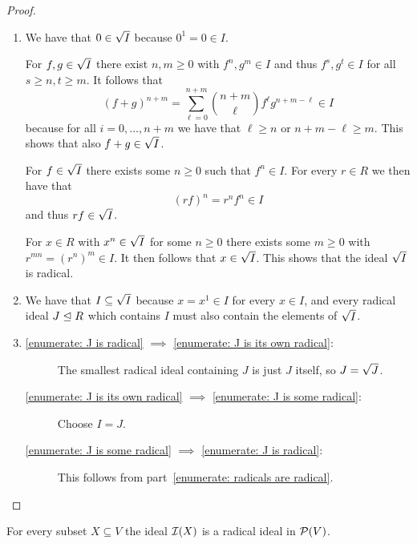 \begin{proof}
    \leavevmode
  \begin{enumerate}
    \item
      We have that $0 \in \sqrt{I}$ because $0^1 = 0 \in I$.
      
      For $f, g \in \sqrt{I}$ there exist $n, m \geq 0$ with $f^n, g^m \in I$ and thus $f^s, g^t \in I$ for all $s \geq n, t \geq m$.
      It follows that
      \[
            (f + g)^{n+m}
        =   \sum_{\ell=0}^{n+m} \binom{n+m}{\ell} f^\ell g^{n+m-\ell}
        \in I
      \]
      because for all $i = 0, \dotsc, n+m$ we have that $\ell \geq n$ or $n+m-\ell \geq m$.
      This shows that also $f + g \in \sqrt{I}$.
      
      For $f \in \sqrt{I}$ there exists some $n \geq 0$ such that $f^n \in I$.
      For every $r \in R$ we then have that
      \[
            (rf)^n
        =   r^n f^n
        \in I
      \]
      and thus $rf \in \sqrt{I}$.
      
      For $x \in R$ with $x^n \in \sqrt{I}$ for some $n \geq 0$ there exists some $m \geq 0$ with $r^{mn} = (r^n)^m \in I$.
      It then follows that $x \in \sqrt{I}$.
      This shows that the ideal $\sqrt{I}$ is radical.
    \item
      We have that $I \subseteq \sqrt{I}$ because $x = x^1 \in I$ for every $x \in I$, and every radical ideal $J \trianglelefteq R$ which contains $I$ must also contain the elements of $\sqrt{I}$.
    \item
      \begin{description}
        \item[\ref*{enumerate: J is radical} $\implies$ \ref*{enumerate: J is its own radical}:]
          The smallest radical ideal containing $J$ is just $J$ itself, so $J = \sqrt{J}$.
        \item[\ref*{enumerate: J is its own radical} $\implies$ \ref*{enumerate: J is some radical}:]
          Choose $I = J$.
        \item[\ref*{enumerate: J is some radical} $\implies$ \ref*{enumerate: J is radical}:]
          This follows from part~\ref*{enumerate: radicals are radical}.
        \qedhere
      \end{description}
  \end{enumerate}
\end{proof}


\begin{lemma}
  \label{lemma: vanishing ideals are radical}
  For every subset $X \subseteq V$ the ideal $\mathcal{I}(X)$ is a radical ideal in $\mathcal{P}(V)$.
\end{lemma}


